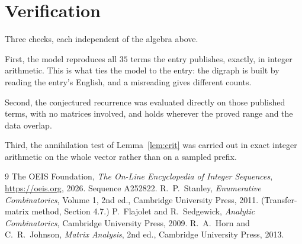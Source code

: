 \documentclass[11pt,a4paper]{article}
\theoremstyle{plain}
\theoremstyle{definition}
\begin{document}
\section{Verification}

Three checks, each independent of the algebra above.

First, the model reproduces all $35$ terms the entry publishes, exactly, in integer
arithmetic. This is what ties the model to the entry: the digraph is built by reading the
entry's English, and a misreading gives different counts.

Second, the conjectured recurrence was evaluated directly on those published terms, with no
matrices involved, and holds wherever the proved range and the data overlap.

Third, the annihilation test of Lemma~\ref{lem:crit} was carried out in exact integer
arithmetic on the whole vector rather than on a sampled prefix.

\begin{thebibliography}{9}
 The OEIS Foundation, \emph{The On-Line Encyclopedia of Integer
Sequences}, \url{https://oeis.org}, 2026. Sequence A252822.
 R.~P.~Stanley, \emph{Enumerative Combinatorics}, Volume 1, 2nd ed.,
Cambridge University Press, 2011. (Transfer-matrix method, Section 4.7.)
 P.~Flajolet and R.~Sedgewick, \emph{Analytic Combinatorics}, Cambridge
University Press, 2009.
 R.~A.~Horn and C.~R.~Johnson, \emph{Matrix Analysis}, 2nd ed., Cambridge
University Press, 2013.
\end{thebibliography}
\end{document}

